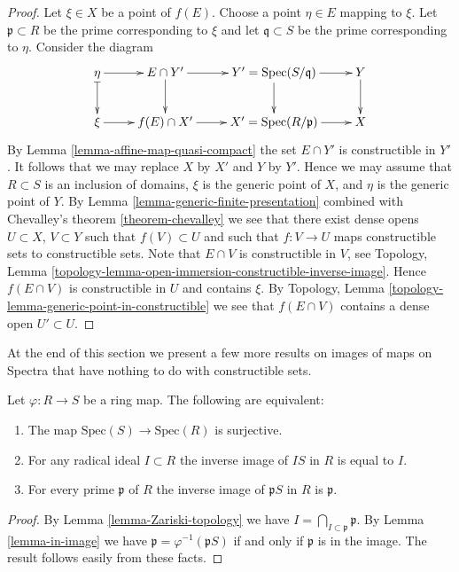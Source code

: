 \begin{proof}
Let $\xi \in X$ be a point of $f(E)$. Choose a point $\eta \in E$
mapping to $\xi$. Let $\mathfrak p \subset R$ be the prime
corresponding to $\xi$ and let $\mathfrak q \subset S$ be the
prime corresponding to $\eta$. Consider the diagram
$$
\xymatrix{
\eta \ar[r] \ar@{|->}[d] & E \cap Y' \ar[r] \ar[d] &
Y' = \text{Spec}(S/\mathfrak q) \ar[r] \ar[d] &
Y \ar[d] \cr
\xi \ar[r] & f(E) \cap X' \ar[r] &
X' = \text{Spec}(R/\mathfrak p) \ar[r] &
X 
}
$$
By Lemma \ref{lemma-affine-map-quasi-compact} the set $E \cap Y'$
is constructible in $Y'$.
It follows that we may replace $X$ by $X'$ and
$Y$ by $Y'$. Hence we may assume that $R \subset S$ is an
inclusion of domains, $\xi$ is the generic
point of $X$, and $\eta$ is the generic point of $Y$.
By Lemma \ref{lemma-generic-finite-presentation}
combined with Chevalley's theorem \ref{theorem-chevalley}
we see that there exist dense opens $U \subset X$,
$V \subset Y$ such that $f(V) \subset U$ and
such that $f : V \to U$ maps constructible sets
to constructible sets. Note that $E \cap V$ is
constructible in $V$, see Topology,
Lemma \ref{topology-lemma-open-immersion-constructible-inverse-image}.
Hence $f(E \cap V)$ is constructible in $U$ and contains $\xi$.
By Topology, Lemma \ref{topology-lemma-generic-point-in-constructible}
we see that $f(E \cap V)$ contains a dense open $U' \subset U$.
\end{proof}

\noindent
At the end of this section we present a few more results on
images of maps on Spectra that have nothing to do with constructible
sets.

\begin{lemma}
\label{lemma-surjective-spec-radical-ideal}
Let $\varphi : R \to S$ be a ring map.
The following are equivalent:
\begin{enumerate}
\item The map $\text{Spec}(S) \to \text{Spec}(R)$ is surjective.
\item For any radical ideal $I \subset R$
the inverse image of $IS$ in $R$ is equal to $I$.
\item For every prime $\mathfrak p$ of $R$ the inverse
image of $\mathfrak p S$ in $R$ is $\mathfrak p$.
\end{enumerate}
\end{lemma}

\begin{proof}
By Lemma \ref{lemma-Zariski-topology} we have
$I = \bigcap_{I \subset \mathfrak p} \mathfrak p$.
By Lemma \ref{lemma-in-image} we have $\mathfrak p
= \varphi^{-1}(\mathfrak p S)$ if and only if
$\mathfrak p$ is in the image.
The result follows easily from these facts.
\end{proof}

